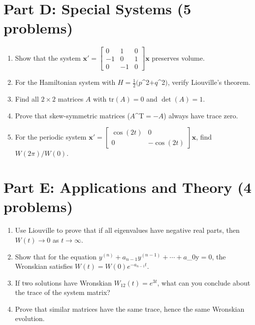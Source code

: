 \documentclass[12pt]{article}
\begin{document}
\section*{Part D: Special Systems (5 problems)}

\begin{enumerate}[resume]
\item Show that the system $\mathbf{x}' = \begin{bmatrix} 0 & 1 & 0 \\ -1 & 0 & 1 \\ 0 & -1 & 0 \end{bmatrix}\mathbf{x}$ preserves volume.

\item For the Hamiltonian system with $H = \frac{1}{2}(p$^{2}$ + q$^{2}$)$, verify Liouville's theorem.

\item Find all $2 \times 2$ matrices $A$ with $\text{tr}(A) = 0$ and $\det(A) = 1$.

\item Prove that skew-symmetric matrices ($A$^{T}$ = -A$) always have trace zero.

\item For the periodic system $\mathbf{x}' = \begin{bmatrix} \cos(2t) & 0 \\ 0 & -\cos(2t) \end{bmatrix}\mathbf{x}$, find $W(2\pi)/W(0)$.
\end{enumerate}

\section*{Part E: Applications and Theory (4 problems)}

\begin{enumerate}[resume]
\item Use Liouville to prove that if all eigenvalues have negative real parts, then $W(t) \to 0$ as $t \to \infty$.

\item Show that for the equation $y^{(n)} + a_{n-1}y^{(n-1)} + \cdots + a$_{0y}$ = 0$, the Wronskian satisfies $W(t) = W(0)e^{-a_{n-1}t}$.

\item If two solutions have Wronskian $W_{12}(t) = e^{3t}$, what can you conclude about the trace of the system matrix?

\item Prove that similar matrices have the same trace, hence the same Wronskian evolution.
\end{enumerate}
\end{document}

